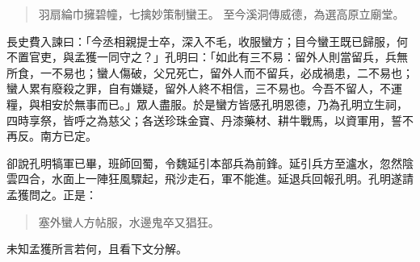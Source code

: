 \begin{quote}
羽扇綸巾擁碧幢，七擒妙策制蠻王。
至今溪洞傳威德，為選高原立廟堂。
\end{quote}

長史費入諫曰：「今丞相親提士卒，深入不毛，收服蠻方；目今蠻王既已歸服，何不置官吏，與孟獲一同守之？」孔明曰：「如此有三不易：留外人則當留兵，兵無所食，一不易也；蠻人傷破，父兄死亡，留外人而不留兵，必成禍患，二不易也；蠻人累有廢殺之罪，自有嫌疑，留外人終不相信，三不易也。今吾不留人，不運糧，與相安於無事而已。」眾人盡服。於是蠻方皆感孔明恩德，乃為孔明立生祠，四時享祭，皆呼之為慈父；各送珍珠金寶、丹漆藥材、耕牛戰馬，以資軍用，誓不再反。南方已定。

卻說孔明犒軍已畢，班師回蜀，令魏延引本部兵為前鋒。延引兵方至瀘水，忽然陰雲四合，水面上一陣狂風驟起，飛沙走石，軍不能進。延退兵回報孔明。孔明遂請孟獲問之。正是：

\begin{quote}
塞外蠻人方帖服，水邊鬼卒又猖狂。
\end{quote}

未知孟獲所言若何，且看下文分解。
